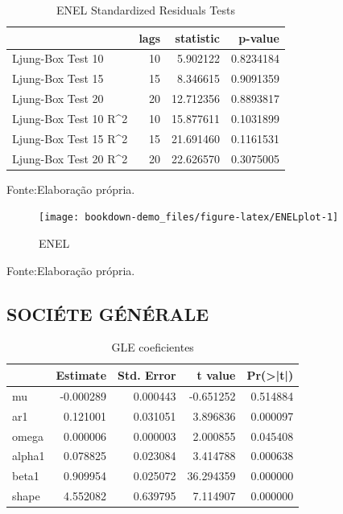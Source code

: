 \documentclass[
  12pt,
  a4paper,
  openany]{book}
\begin{document}
\begin{table}[!h]

\caption{\label{tab:unnamed-chunk-27}ENEL Standardized Residuals Tests}
\centering
\begin{tabular}[t]{lrrr}
\toprule
  & lags & statistic & p-value\\
\midrule
Ljung-Box Test 10 & 10 & 5.902122 & 0.8234184\\
Ljung-Box Test 15 & 15 & 8.346615 & 0.9091359\\
Ljung-Box Test 20 & 20 & 12.712356 & 0.8893817\\
Ljung-Box Test 10 R\textasciicircum{}2 & 10 & 15.877611 & 0.1031899\\
Ljung-Box Test 15 R\textasciicircum{}2 & 15 & 21.691460 & 0.1161531\\
\addlinespace
Ljung-Box Test 20 R\textasciicircum{}2 & 20 & 22.626570 & 0.3075005\\
\bottomrule
\end{tabular}
\end{table}
\FloatBarrier
\centering

Fonte:Elaboração própria.

\justifying
\bigskip
\begin{figure}

{\centering \texttt{[image: bookdown-demo\_files/figure-latex/ENELplot-1]} 

}

\caption{ENEL}\label{fig:ENELplot}
\end{figure}
\FloatBarrier
\centering

Fonte:Elaboração própria.

\justifying
\bigskip

\hypertarget{sociuxe9te-guxe9nuxe9rale}{%
\subsection{SOCIÉTE GÉNÉRALE}\label{sociuxe9te-guxe9nuxe9rale}}

\begin{table}[!h]

\caption{\label{tab:unnamed-chunk-29}GLE coeficientes}
\centering
\begin{tabular}[t]{lrrrr}
\toprule
  &  Estimate &  Std. Error &  t value & Pr(>|t|)\\
\midrule
mu & -0.000289 & 0.000443 & -0.651252 & 0.514884\\
ar1 & 0.121001 & 0.031051 & 3.896836 & 0.000097\\
omega & 0.000006 & 0.000003 & 2.000855 & 0.045408\\
alpha1 & 0.078825 & 0.023084 & 3.414788 & 0.000638\\
beta1 & 0.909954 & 0.025072 & 36.294359 & 0.000000\\
\addlinespace
shape & 4.552082 & 0.639795 & 7.114907 & 0.000000\\
\bottomrule
\end{tabular}
\end{table}
\FloatBarrier
\centering
\end{document}
